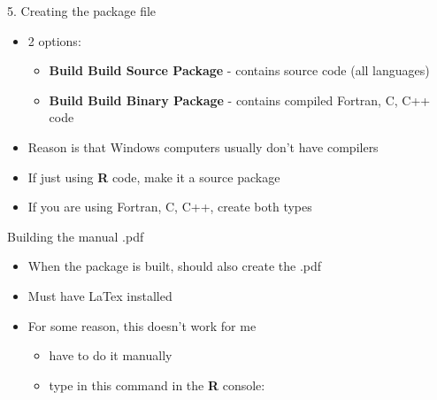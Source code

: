 \documentclass[
  ignorenonframetext,
  aspectratio=169]{beamer}
\providecommand{\tightlist}{%
  \setlength{\itemsep}{0pt}\setlength{\parskip}{0pt}}
\begin{document}
\begin{frame}{5. Creating the package file}
\protect\hypertarget{creating-the-package-file}{}
\begin{itemize}
\tightlist
\item
  2 options:

  \begin{itemize}
  \tightlist
  \item
    \textbf{Build \textbar{} Build Source Package} - contains source
    code (all languages)
  \item
    \textbf{Build \textbar{} Build Binary Package} - contains compiled
    Fortran, C, C++ code
  \end{itemize}
\item
  Reason is that Windows computers usually don't have compilers
\item
  If just using \textbf{R} code, make it a source package
\item
  If you are using Fortran, C, C++, create both types
\end{itemize}
\end{frame}

\begin{frame}{Building the manual .pdf}
\protect\hypertarget{building-the-manual-.pdf}{}
\begin{itemize}
\tightlist
\item
  When the package is built, should also create the .pdf
\item
  Must have LaTex installed
\item
  For some reason, this doesn't work for me

  \begin{itemize}
  \tightlist
  \item
    have to do it manually
  \item
    type in this command in the \textbf{R} console:
  \end{itemize}
\end{itemize}
\end{frame}
\end{document}
